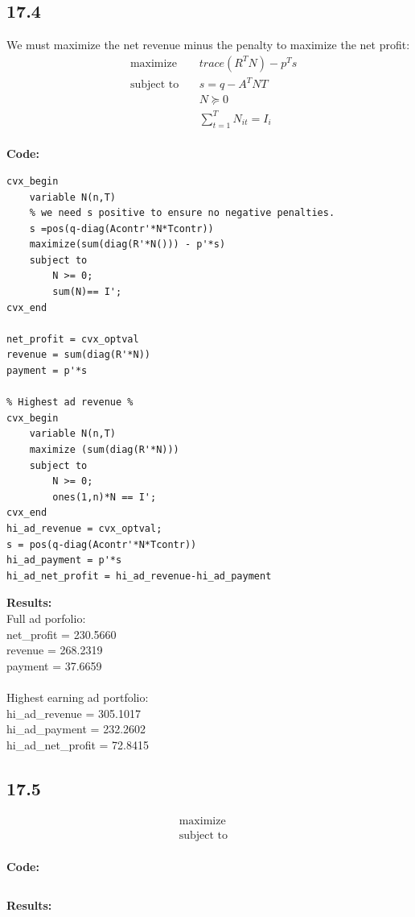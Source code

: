 \documentclass[12pt]{article}
\begin{document}
\subsection*{17.4}
We must maximize the net revenue minus the penalty to maximize the net profit:
\begin{equation*}
\begin{aligned}
& \underset{}{\text{maximize}}
& & trace(R^TN) - p^Ts\\
& \text{subject to}\
& & s = q - A^TNT\\
&&& N \succeq 0\\
&&& \sum_{t=1}^{T}N_{it} = I_{i}
\end{aligned}
\end{equation*}\\
\textbf{Code:}\\
\begin{lstlisting}
cvx_begin
    variable N(n,T)
    % we need s positive to ensure no negative penalties.
    s =pos(q-diag(Acontr'*N*Tcontr))
    maximize(sum(diag(R'*N())) - p'*s)
    subject to
        N >= 0;
        sum(N)== I';
cvx_end

net_profit = cvx_optval
revenue = sum(diag(R'*N))
payment = p'*s

% Highest ad revenue %
cvx_begin
    variable N(n,T)
    maximize (sum(diag(R'*N)))
    subject to
        N >= 0;
        ones(1,n)*N == I';
cvx_end
hi_ad_revenue = cvx_optval;
s = pos(q-diag(Acontr'*N*Tcontr))
hi_ad_payment = p'*s
hi_ad_net_profit = hi_ad_revenue-hi_ad_payment
\end{lstlisting}
\textbf{Results:}\\
Full ad porfolio:\\
net\_profit = 230.5660\\
revenue = 268.2319\\
payment = 37.6659\\\\
Highest earning ad portfolio:\\
hi\_ad\_revenue = 305.1017 \\
hi\_ad\_payment = 232.2602 \\
hi\_ad\_net\_profit = 72.8415 \\

\subsection*{17.5}
\begin{equation*}
\begin{aligned}
& \underset{}{\text{maximize}}
& & \\
& \text{subject to}\
& & 
\end{aligned}
\end{equation*}\\
\textbf{Code:}\\
\begin{lstlisting}

\end{lstlisting}
\textbf{Results:}\\
\end{document}

